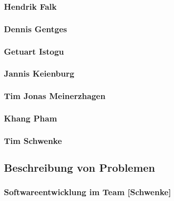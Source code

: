 \subsubsection{Hendrik Falk}

\subsubsection{Dennis Gentges}

\subsubsection{Getuart Istogu}

\subsubsection{Jannis Keienburg}

\subsubsection{Tim Jonas Meinerzhagen}

\subsubsection{Khang Pham}

\subsubsection{Tim Schwenke}

\subsection{Beschreibung von Problemen}

\subsubsection{Softwareentwicklung im Team [Schwenke]}

